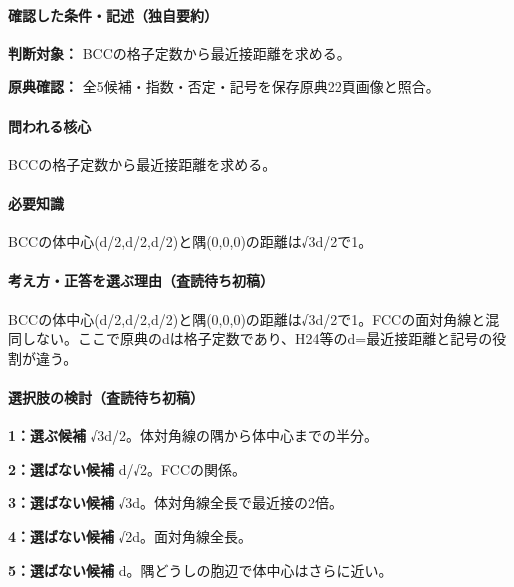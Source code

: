 \paragraph{確認した条件・記述（独自要約）}\mbox{}\par

\noindent\textbf{判断対象：} BCCの格子定数から最近接距離を求める。\par

\noindent\textbf{原典確認：} 全5候補・指数・否定・記号を保存原典22頁画像と照合。\par

\paragraph{問われる核心} BCCの格子定数から最近接距離を求める。

\paragraph{必要知識} BCCの体中心(d/2,d/2,d/2)と隅(0,0,0)の距離は√3d/2で1。

\paragraph{考え方・正答を選ぶ理由（査読待ち初稿）} BCCの体中心(d/2,d/2,d/2)と隅(0,0,0)の距離は√3d/2で1。FCCの面対角線と混同しない。ここで原典のdは格子定数であり、H24等のd=最近接距離と記号の役割が違う。

\paragraph{選択肢の検討（査読待ち初稿）}\mbox{}\par

\noindent\textbf{1：選ぶ候補} √3d/2。体対角線の隅から体中心までの半分。\par

\noindent\textbf{2：選ばない候補} d/√2。FCCの関係。\par

\noindent\textbf{3：選ばない候補} √3d。体対角線全長で最近接の2倍。\par

\noindent\textbf{4：選ばない候補} √2d。面対角線全長。\par

\noindent\textbf{5：選ばない候補} d。隅どうしの胞辺で体中心はさらに近い。\par

